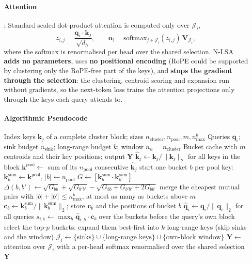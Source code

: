 \paragraph{Attention}: Standard scaled dot-product attention is computed only over $\mathcal{J}_i$,
\[
z_{i,j} = \frac{\mathbf{q}_i \cdot \mathbf{k}_j}{\sqrt{d_h}}, \qquad
\mathbf{o}_i = \mathrm{softmax}_{j \in \mathcal{J}_i}(z_{i,j})\, \mathbf{V}_{\mathcal{J}_i},
\]
where the softmax is renormalised per head over the shared selection. N-LSA \textbf{adds no parameters}, uses \textbf{no positional encoding} (RoPE could be supported by clustering only the RoPE-free part of the keys), and \textbf{stops the gradient through the selection}: the clustering, centroid scoring and expansion run without gradients, so the next-token loss trains the attention projections only through the keys each query attends to.

\paragraph{Algorithmic Pseudocode}

\begin{algorithm}[H]
\caption{N-LSA: Ward clustering of one cluster block and flat semantic search}
\begin{algorithmic}[1]
\Require Index keys $\mathbf{k}_j$ of a complete cluster block; sizes $n_{\text{cluster}}, n_{\text{pool}}, m, n_{\max}^b$
\Require Queries $\mathbf{q}_i$; sink budget $n_{\text{sink}}$; long-range budget $k$; window $n_w = n_{\text{cluster}}$
\Ensure Bucket cache with $m$ centroids and their key positions; output $\mathbf{Y}$
\State $\hat{\mathbf{k}}_j \gets \mathbf{k}_j / \lVert \mathbf{k}_j \rVert_2$ for all keys in the block
    \State $\mathbf{k}^{\text{pool}} \gets$ sum of its $n_{\text{pool}}$ consecutive $\hat{\mathbf{k}}_j$
\EndFor
\State start one bucket $b$ per pool key: $\mathbf{k}^{\text{sum}}_b \gets \mathbf{k}^{\text{pool}}$, $|b| \gets n_{\text{pool}}$
    \State $G \gets [\mathbf{k}^{\text{sum}}_b \cdot \mathbf{k}^{\text{sum}}_{b'}]$ 
    \State $\Delta(b,b') \gets \sqrt{G_{bb}} + \sqrt{G_{b'b'}} - \sqrt{G_{bb} + G_{b'b'} + 2G_{bb'}}$
    \State merge the cheapest mutual pairs with $|b| + |b'| \le n_{\max}^b$, at most as many as buckets above $m$
\EndWhile
\State $\mathbf{c}_b \gets \mathbf{k}^{\text{sum}}_b / \lVert \mathbf{k}^{\text{sum}}_b \rVert_2$; store $\mathbf{c}_b$ and the positions of bucket $b$
\State $\hat{\mathbf{q}}_i \gets \mathbf{q}_i / \lVert \mathbf{q}_i \rVert_2$ for all queries
\State $s_{i,b} \gets \max_h \hat{\mathbf{q}}_{i,h} \cdot \mathbf{c}_b$ over the buckets before the query's own block
\State select the top-$p$ buckets; expand them best-first into $k$ long-range keys (skip sinks and the window)
\State $\mathcal{J}_i \gets \{\text{sinks}\} \cup \{\text{long-range keys}\} \cup \{\text{own-block window}\}$
\State $\mathbf{Y} \gets$ attention over $\mathcal{J}_i$ with a per-head softmax renormalised over the shared selection
\Return $\mathbf{Y}$
\end{algorithmic}
\end{algorithm}

